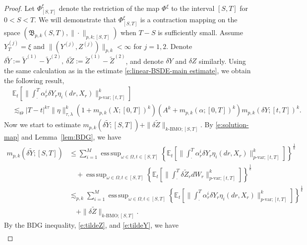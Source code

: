 \documentclass[11pt,reqno]{amsart}
\DeclareMathOperator*{\esssup}{ess\,sup}
\numberwithin{equation}{section}
\begin{document}
\begin{proof}
Let $\Phi^{\xi}_{[S,T]}$ denote the restriction of the map $\Phi^{\xi}$ to the interval $[S,T]$ for $0<S<T$. We will demonstrate that $\Phi^{\xi}_{[S,T]}$ is a contraction mapping on the space $(\mathfrak{B}_{p,k}(S,T),\|\cdot\|_{p,k;[S,T]})$ when $T-S$ is sufficiently small.  Assume $Y^{(j)}_{T} = \xi$ and $\|(Y^{(j)},Z^{(j)})\|_{p,k}<\infty$ for $j=1,2$. Denote $\delta \tilde{Y}:=\tilde{Y}^{(1)} - \tilde{Y}^{(2)},\ \delta \tilde{Z}:=\tilde{Z}^{(1)} - \tilde{Z}^{(2)}$, and denote $\delta Y $ and $\delta Z$ similarly. Using the same calculation as in the estimate \eqref{e:linear-BSDE-main estimate}, we obtain the following result,
\begin{equation}\label{e:Y1-Y2}
\begin{aligned}
&\mathbb{E}_{t}\left[\Big\|\int_{\cdot}^{T}\alpha^{i}_{r}\delta Y_r\eta_{i}(dr,X_{r})\Big\|^{k}_{p\text{-var};[t,T]}\right]\\
&\lesssim_{\Theta} |T-t|^{k\tau}\|\eta\|^{k}_{\tau,\lambda}\left(1 + m_{p,k}(X;[0,T])^{k}\right)\left(A^{k} + m_{p,k}(\alpha;[0,T])^{k}\right)    m_{p,k}(\delta Y;[t,T])^{k}.
\end{aligned}
\end{equation}
Now we start to estimate $m_{p,k}(\delta\tilde{Y};[S,T]) + \|\delta\tilde{Z}\|_{k\text{-BMO};[S,T]}$. By \eqref{e:solution-map} and Lemma~\ref{lem:BDG}, we have
\begin{equation}\label{e:deltatildeY}
\begin{aligned}
m_{p,k}(\delta \tilde{Y};[S,T])&\le \sum_{i=1}^{M}\esssup_{\omega\in\Omega,t\in[S,T]}\left\{\mathbb{E}_{t}\left[\Big\|\int_{\cdot}^{T}\alpha^{i}_{r}\delta Y_r\eta_{i}(dr,X_{r})\Big\|^{k}_{p\text{-var};[t,T]}\right]\right\}^{\frac{1}{k}}\\ 
&\quad + \esssup_{\omega\in\Omega,t\in[S,T]}\left\{\mathbb{E}_{t}\left[\Big\|\int_{\cdot}^{T}\delta\tilde{Z}_{r} dW_{r}\Big\|^{k}_{p\text{-var};[t,T]}\right]\right\}^{\frac{1}{k}}\\
&\lesssim_{p,k} \sum_{i=1}^{M}\esssup_{\omega\in\Omega,t\in[S,T]}\left\{\mathbb{E}_{t}\left[\Big\|\int_{\cdot}^{T}\alpha^{i}_{r}\delta Y_r\eta_{i}(dr,X_{r})\Big\|^{k}_{p\text{-var};[t,T]}\right]\right\}^{\frac{1}{k}}\\ 
& \quad + \|\delta\tilde{Z}\|_{k\text{-BMO};[S,T]}.
\end{aligned}
\end{equation}
By the BDG inequality, \eqref{e:tildeZ}, and \eqref{e:tildeY}, we have
\begin{equation}\label{e:deltatildeZ}
\begin{aligned}

\end{aligned}
\end{equation}
\end{proof}
\end{document}

